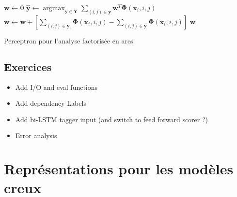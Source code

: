 \documentclass[11pt,openany]{book}
\begin{document}
\begin{algorithm}[htbp]
\begin{algorithmic}[1]
\State $\mathbf{w} \gets \bar{\mathbf{0}}$
\State
$\hat{\mathbf{y}} \gets \mathop{\text{argmax}}_{\mathbf{y}\in
  \mathbf{Y}} 
\sum_{(i,j) \in \mathbf{y}} \mathbf{w}^T \boldsymbol\Phi(\mathbf{x}_i,i,j)$
     \State $\mathbf{w} \gets  \mathbf{w} +
     \left[ \sum_{(i,j) \in \mathbf{y}_i} \boldsymbol\Phi(\mathbf{x}_i,i,j) 
       - \sum_{(i,j) \in
         \hat{\mathbf{y}}}\boldsymbol\Phi(\mathbf{x}_i,i,j)   \right]$ 
\EndIf
\EndFor
\EndFor
\State \Return $\mathbf{w}$
\EndFunction
\end{algorithmic}
\caption{\label{perceptron-eisner}Perceptron pour l'analyse factorisée
en arcs}
\end{algorithm}



\section{Exercices}
\begin{itemize}
\item Add I/O and eval functions
\item Add dependency Labels
\item Add bi-LSTM tagger input (and switch to feed forward scorer ?)
\item Error analysis
\end{itemize}





\appendix
\chapter{Représentations pour les modèles creux}

\end{document}
